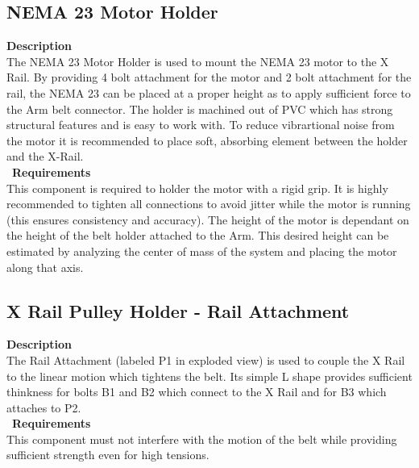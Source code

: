 \documentclass[titlepage]{article}
\begin{document}
\begin{center}


\subsection{NEMA 23 Motor Holder}
\textbf{Description}\\
The NEMA 23 Motor Holder is used to mount the NEMA 23 motor to the X Rail. By providing 4 bolt attachment for the motor and 2 bolt attachment for the rail, the NEMA 23 can be placed at a proper height as to apply sufficient force to the Arm belt connector. The holder is machined out of PVC which has strong structural features and is easy to work with. To reduce vibrartional noise from the motor it is recommended to place soft, absorbing element between the holder and the X-Rail.\\\
\textbf{Requirements}\\
This component is required to holder the motor with a rigid grip. It is highly recommended to tighten all connections to avoid jitter while the motor is running (this ensures consistency and accuracy). The height of the motor is dependant on the height of the belt holder attached to the Arm. This desired height can be estimated by analyzing the center of mass of the system and placing the motor along that axis. 
\begin{center}



\subsection{X Rail Pulley Holder - Rail Attachment}
\textbf{Description}\\
The Rail Attachment (labeled P1 in exploded view) is used to couple the X Rail to the linear motion which tightens the belt. Its simple L shape provides sufficient thinkness for bolts B1 and B2 which connect to the X Rail and for B3 which attaches to P2. \\\
\textbf{Requirements}\\
This component must not interfere with the motion of the belt while providing sufficient strength even for high tensions.
\begin{center}



\end{center}
\end{center}
\end{center}
\end{document}
